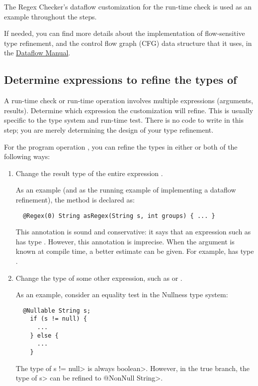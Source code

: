 The Regex Checker's dataflow customization for the
run-time check is used as an example throughout the steps.

If needed, you can find more details about the implementation of
flow-sensitive type refinement, and the control flow graph (CFG) data
structure that it uses, in the
\href{https://checkerframework.org/manual/checker-framework-dataflow-manual.pdf}{Dataflow
  Manual}.


\subsection{Determine expressions to refine the types of\label{creating-dataflow-determine-expressions}}

A run-time check or run-time
operation involves multiple expressions (arguments, results).
Determine which expression the customization will refine.  This is
usually specific to the type system and run-time test.
There is no code to write in this step; you are merely determining
the design of your type refinement.

For the program operation , you can refine
the types in either or both of the following ways:
\begin{enumerate}
\item Change the result type of the entire expression .

As an example (and as the running example of implementing a dataflow
refinement), the  method is declared as:

\begin{smaller}
\begin{Verbatim}
  @Regex(0) String asRegex(String s, int groups) { ... }
\end{Verbatim}
\end{smaller}

\noindent
This annotation is sound and conservative:  it says that an expression such
as  has type .  However, this annotation is imprecise.  When the 
argument is known at compile time, a better estimate can be given.  For
example,  has type .

\item Change the type of some other expression, such as  or .

As an example, consider an equality test in the Nullness type system:

\begin{Verbatim}
  @Nullable String s;
    if (s != null) {
      ...
    } else {
      ...
    }
\end{Verbatim}

The type of \<s != null> is always \<boolean>.  However, in the
true branch, the type of \<s> can be refined to \<@NonNull String>.

\end{enumerate}


